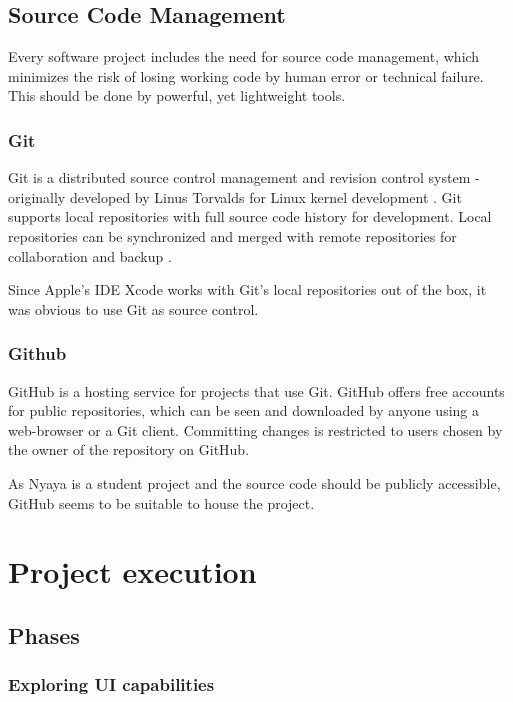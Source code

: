 \subsection{Source Code Management}
\label{sec:SCM}

Every software project includes the need for source code management,
which minimizes the risk of losing working code
by human error or technical failure.
This should be done by powerful, yet lightweight tools.



\subsubsection{Git}

Git is a distributed source control management and revision control system 
- originally developed by Linus Torvalds for Linux kernel development \cite{Git:Main}.
Git supports local repositories with full source code history for development.
Local repositories can be synchronized and merged with remote repositories for collaboration and backup
\cite{Chacon:2009:PG:1618548}.

Since Apple's IDE Xcode works with Git's local repositories out of the box,
it was obvious to use Git as source control.

\subsubsection{Github}

GitHub \cite{GitHub:Main} is a hosting service for projects that use Git. 
GitHub offers free accounts for public repositories, 
which can be seen and downloaded by anyone
using a web-browser or a Git client.
Committing changes is restricted to users chosen by the owner of the repository on GitHub.


As Nyaya is a student project and the source code should be publicly accessible,
GitHub seems to be suitable to house the project.

\section{Project execution}

\subsection{Phases}

\subsubsection{Exploring UI capabilities}

